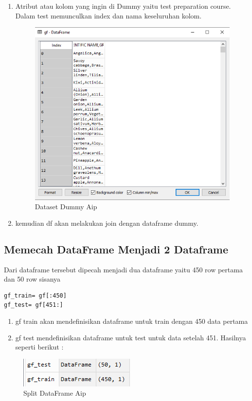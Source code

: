 \begin{enumerate}
\item Atribut atau kolom yang ingin di Dummy yaitu test preparation course. Dalam test memunculkan index dan nama keseluruhan kolom.
\begin{figure}[!hbtp]
\centering
\includegraphics[scale=0.5]{figures/AIP/c3.PNG}
\caption{Dataset Dummy Aip}
\label{Aplikasi Pandas}
\end{figure}
\item kemudian df akan melakukan join dengan dataframe dummy.
\end{enumerate}

\subsection{Memecah DataFrame Menjadi 2 Dataframe}
Dari dataframe tersebut dipecah menjadi dua dataframe yaitu 450 row pertama dan 50 row sisanya
\begin{verbatim}
gf_train= gf[:450]
gf_test= gf[451:]
\end{verbatim}
\begin{enumerate}
\item gf train akan mendefinisikan dataframe untuk train dengan 450 data pertama
\item gf test mendefinisikan dataframe untuk test untuk data setelah 451. Hasilnya seperti berikut :
\end{enumerate}
\begin{figure}[!hbtp]
\centering
\includegraphics[scale=0.5]{figures/AIP/c4.PNG}
\caption{Split DataFrame Aip}
\label{Aplikasi Pandas}
\end{figure}

